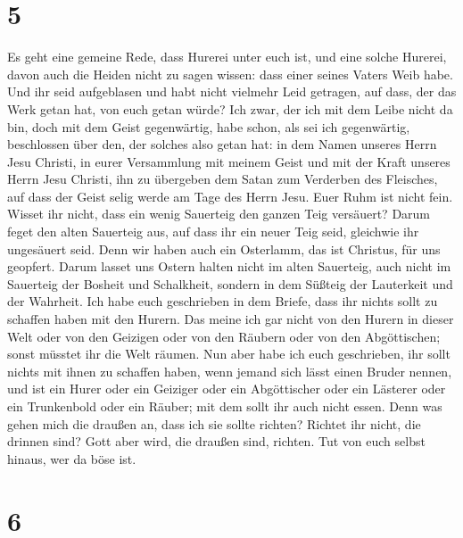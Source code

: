 \hypertarget{section-4}{%
\section{5}\label{section-4}}

 Es geht eine gemeine Rede, dass Hurerei unter euch ist,
und eine solche Hurerei, davon auch die Heiden nicht zu sagen wissen:
dass einer seines Vaters Weib habe.  Und ihr seid
aufgeblasen und habt nicht vielmehr Leid getragen, auf dass, der das
Werk getan hat, von euch getan würde?  Ich zwar, der ich
mit dem Leibe nicht da bin, doch mit dem Geist gegenwärtig, habe schon,
als sei ich gegenwärtig, beschlossen über den, der solches also getan
hat:  in dem Namen unseres Herrn Jesu Christi, in eurer
Versammlung mit meinem Geist und mit der Kraft unseres Herrn Jesu
Christi,  ihn zu übergeben dem Satan zum Verderben des
Fleisches, auf dass der Geist selig werde am Tage des Herrn Jesu.
 Euer Ruhm ist nicht fein. Wisset ihr nicht, dass ein
wenig Sauerteig den ganzen Teig versäuert?  Darum feget
den alten Sauerteig aus, auf dass ihr ein neuer Teig seid, gleichwie ihr
ungesäuert seid. Denn wir haben auch ein Osterlamm, das ist Christus,
für uns geopfert.  Darum lasset uns Ostern halten nicht im
alten Sauerteig, auch nicht im Sauerteig der Bosheit und Schalkheit,
sondern in dem Süßteig der Lauterkeit und der Wahrheit. 
Ich habe euch geschrieben in dem Briefe, dass ihr nichts sollt zu
schaffen haben mit den Hurern.  Das meine ich gar nicht
von den Hurern in dieser Welt oder von den Geizigen oder von den Räubern
oder von den Abgöttischen; sonst müsstet ihr die Welt räumen.
 Nun aber habe ich euch geschrieben, ihr sollt nichts mit
ihnen zu schaffen haben, wenn jemand sich lässt einen Bruder nennen, und
ist ein Hurer oder ein Geiziger oder ein Abgöttischer oder ein Lästerer
oder ein Trunkenbold oder ein Räuber; mit dem sollt ihr auch nicht
essen.  Denn was gehen mich die draußen an, dass ich sie
sollte richten? Richtet ihr nicht, die drinnen sind? 
Gott aber wird, die draußen sind, richten. Tut von euch selbst hinaus,
wer da böse ist.

\hypertarget{section-5}{%
\section{6}\label{section-5}}

